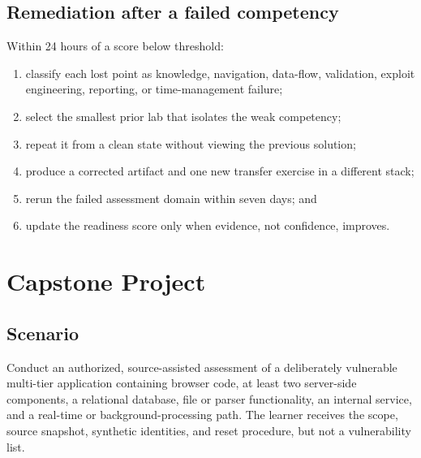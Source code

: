 \documentclass[11pt]{article}
\begin{document}
\subsection{Remediation after a failed competency}
Within 24 hours of a score below threshold:
\begin{enumerate}
  \item classify each lost point as knowledge, navigation, data-flow, validation, exploit engineering, reporting, or time-management failure;
  \item select the smallest prior lab that isolates the weak competency;
  \item repeat it from a clean state without viewing the previous solution;
  \item produce a corrected artifact and one new transfer exercise in a different stack;
  \item rerun the failed assessment domain within seven days; and
  \item update the readiness score only when evidence, not confidence, improves.
\end{enumerate}

\section{Capstone Project}
\label{sec:capstone}

\subsection{Scenario}
Conduct an authorized, source-assisted assessment of a deliberately vulnerable
multi-tier application containing browser code, at least two server-side
components, a relational database, file or parser functionality, an internal
service, and a real-time or background-processing path. The learner receives the
scope, source snapshot, synthetic identities, and reset procedure, but not a
vulnerability list.
\end{document}
